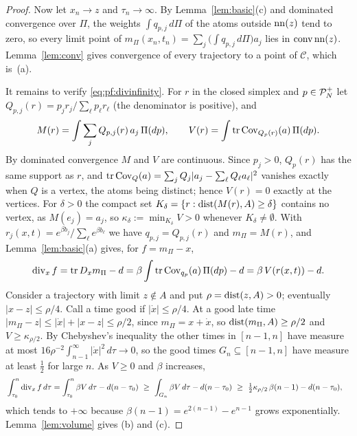 \documentclass{article} %
\newcommand{\iclrstart}{\begin{aligned}&}\newcommand{\iclrend}{\end{aligned}}
\newcommand{\iclrallow}{\allowbreak}
\newcommand{\iclrstart}{}\newcommand{\iclrend}{}\newcommand{\iclrallow}{}
\theoremstyle{plain}
\theoremstyle{definition}
\theoremstyle{remark}
\begin{document}
\begin{proof}
Now let $x_n\to z$ and $\tau_n\to\infty$. By Lemma~\ref{lem:basic}(c) and dominated convergence over
$\Pi$, the weights $\int q_{p,j}\,d\Pi$ of the atoms outside $\operatorname{nn}(z)$ tend to zero, so every limit
point of $m_\Pi(x_n,t_n)=\sum_j\bigl(\int q_{p,j}\,d\Pi\bigr)a_j$ lies in $\operatorname{conv}\operatorname{nn}(z)$.
Lemma~\ref{lem:conv} gives convergence of every trajectory to a point of $\mathcal C$, which is~(a).

It remains to verify \eqref{eq:pf:divinfinity}. For $r$ in the closed simplex and $p\in\mathcal{P}_N^{+}$ let
$Q_{p,j}(r)=p_jr_j/\sum_\ell p_\ell r_\ell$ (the denominator is positive), and
\[
M(r)=\int\sum_jQ_{p,j}(r)\,a_j\,\Pi(dp),\qquad V(r)=\int\operatorname{tr}\operatorname{Cov}_{Q_p(r)}(a)\,\Pi(dp).
\]
By dominated convergence $M$ and $V$ are continuous. Since $p_j>0$, $Q_p(r)$ has the same support as
$r$, and $\operatorname{tr}\operatorname{Cov}_Q(a)=\sum_jQ_j|a_j-\sum_\ell Q_\ell a_\ell|^2$ vanishes exactly when $Q$ is a
vertex, the atoms being distinct; hence $V(r)=0$ exactly at the vertices. For $\delta>0$ the compact
set $K_\delta=\{r:\operatorname{dist}(M(r),A)\ge\delta\}$ contains no vertex, as $M(e_j)=a_j$, so
$\kappa_\delta:=\min_{K_\delta}V>0$ whenever $K_\delta\neq\emptyset$. With
$r_j(x,t)=e^{\beta b_j}/\sum_\ell e^{\beta b_\ell}$ we have $q_{p,j}=Q_{p,j}(r)$ and $m_\Pi=M(r)$,
and Lemma~\ref{lem:basic}(a) gives, for $f=m_\Pi-x$,
\[
\operatorname{div}_xf=\operatorname{tr} D_xm_\Pi-d=\beta\int\operatorname{tr}\operatorname{Cov}_{q_p}(a)\,\Pi(dp)-d=\beta\,V(r(x,t))-d .
\]
Consider a trajectory with limit $z\notin A$ and put $\rho=\operatorname{dist}(z,A)>0$; eventually
$|x-z|\le\rho/4$. Call a time good if $|\dot x|\le\rho/4$. At a good late time
$|m_\Pi-z|\le|\dot x|+|x-z|\le\rho/2$, since $m_\Pi=x+\dot x$, so $\operatorname{dist}(m_\Pi,A)\ge\rho/2$ and
$V\ge\kappa_{\rho/2}$. By Chebyshev's inequality the other times in $[n-1,n]$ have measure at most
$16\rho^{-2}\int_{n-1}^\infty|\dot x|^2\,d\tau\to0$, so the good times $G_n\subseteq[n-1,n]$ have
measure at least $\tfrac12$ for large $n$. As $V\ge0$ and $\beta$ increases,
\begin{align*}
\iclrstart\int_{\tau_0}^n\operatorname{div}_xf\,d\tau
=\int_{\tau_0}^n\beta V\,d\tau-d(n-\tau_0)
\ \ge\ \int_{G_n}\beta V\,d\tau-d(n-\tau_0)
\iclrbrq\ \ge\ \tfrac12\kappa_{\rho/2}\,\beta(n-1)-d(n-\tau_0),\iclrend
\end{align*}
which tends to $+\infty$ because $\beta(n-1)=e^{2(n-1)}-e^{n-1}$ grows exponentially.
Lemma~\ref{lem:volume} gives (b) and (c).
\end{proof}
\end{document}
